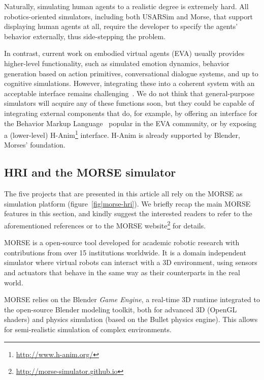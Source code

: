 \documentclass[conference]{IEEEtran}
\begin{document}
Naturally, simulating human agents to a realistic degree is extremely hard.
All robotics-oriented simulators, including both USARSim and Morse, that
support displaying human agents at all, require the developer to specify the
agents' behavior externally, thus side-stepping the problem.

In contrast, current work on embodied virtual agents (EVA) usually provides 
higher-level functionality, such as simulated emotion dynamics, behavior 
generation based on action primitives, conversational dialogue systems, and
up to cognitive simulations. However, integrating these into a coherent 
system with an acceptable interface remains 
challenging~\cite{gratch2002creating}. We do not think that general-purpose
simulators will acquire any of these functions soon, but they could be
capable of integrating external components that do, for example, by offering 
an interface for the Behavior Markup Language~\cite{kopp2006towards} popular
in the EVA community, or by exposing a (lower-level) 
H-Anim\footnote{\url{http://www.h-anim.org/}} interface. H-Anim is already
supported by Blender, Morses' foundation.




\subsection*{HRI and the MORSE simulator}

The five projects that are presented in this article all rely on the MORSE as
simulation platform (figure~\ref{fig|morse-hri}). We briefly recap the main
MORSE features in this section, and kindly suggest the interested readers to
refer to the aforementioned references or to the MORSE
website\footnote{\url{http://morse-simulator.github.io}} for details.

MORSE is a open-source tool developed for academic robotic research with
contributions from over 15 institutions worldwide. It is a domain independent
simulator where virtual robots can interact with a 3D environment, using
sensors and actuators that behave in the same way as their counterparts in the
real world.

MORSE relies on the Blender \emph{Game Engine}, a real-time 3D runtime
integrated to the open-source Blender modeling toolkit, both for advanced 3D
(OpenGL shaders) and physics simulation (based on the {\sc Bullet} physics
engine). This allows for semi-realistic simulation of complex environments.
\end{document}
